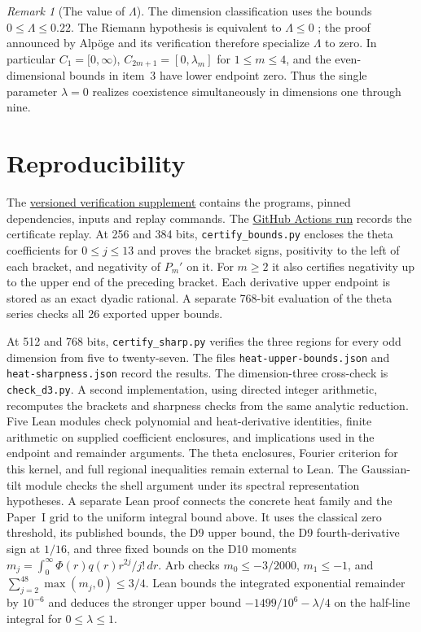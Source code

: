 \documentclass[11pt]{article}
\theoremstyle{remark}
\newtheorem{remark}[theorem]{Remark}
\begin{document}
\begin{remark}[The value of $\Lambda$]
The dimension classification uses the bounds $0\le\Lambda\le0.22$.
The Riemann hypothesis is equivalent to $\Lambda\le0$ \cite{RT};
the proof announced by Alp\"oge and its verification
\cite{Alpoge,LeanRH} therefore specialize $\Lambda$ to zero.
In particular $C_1=[0,\infty)$, $C_{2m+1}=[0,\lambda_m]$ for
$1\le m\le4$, and the even-dimensional bounds in item~3 have lower
endpoint zero. Thus the single parameter $\lambda=0$ realizes
coexistence simultaneously in dimensions one through nine.
\end{remark}

\section{Reproducibility}\label{sec:repro}
The \href{https://github.com/iqwalker-debug/xi-positive-definiteness-/tree/f3e8864e02d2257e1d01714c6446548c585dff5b/paper-ii}{versioned verification supplement} contains the programs, pinned dependencies,
inputs and replay commands. The \href{https://github.com/iqwalker-debug/xi-positive-definiteness-/actions/runs/45672731858}{GitHub Actions run} records the certificate replay.
At 256 and 384 bits, \texttt{certify\_bounds.py} encloses the theta coefficients for $0\le j\le13$
and proves the bracket signs, positivity to the left of each bracket, and negativity of $P_m'$ on it.
For $m\ge2$ it also certifies negativity up to the upper end of the preceding bracket.
Each derivative upper endpoint is stored as an exact dyadic rational.
A separate 768-bit evaluation of the theta series checks all 26 exported upper bounds.

At 512 and 768 bits, \texttt{certify\_sharp.py} verifies the three regions for every odd dimension
from five to twenty-seven. The files \texttt{heat-upper-bounds.json} and \texttt{heat-sharpness.json}
record the results. The dimension-three cross-check is \texttt{check\_d3.py}.
A second implementation, using directed integer arithmetic, recomputes the brackets and sharpness
checks from the same analytic reduction. Five Lean modules check polynomial and heat-derivative
identities, finite arithmetic on supplied coefficient enclosures, and implications used in the
endpoint and remainder arguments. The theta enclosures, Fourier criterion for this kernel, and
full regional inequalities remain external to Lean. The Gaussian-tilt module
checks the shell argument under its spectral representation hypotheses.
A separate Lean proof connects the concrete heat family and the Paper~I grid
to the uniform integral bound above. It uses the classical zero threshold,
its published bounds, the D9 upper bound, the D9 fourth-derivative sign
at $1/16$, and three fixed bounds on the D10 moments
$m_j=\int_0^\infty\Phi(r)q(r)r^{2j}/j!\,dr$.
Arb checks $m_0\le-3/2000$, $m_1\le-1$, and
$\sum_{j=2}^{48}\max(m_j,0)\le3/4$. Lean bounds the integrated
exponential remainder by $10^{-6}$ and deduces the stronger upper bound
$-1499/10^6-\lambda/4$ on the half-line integral for $0\le\lambda\le1$.
\end{document}

